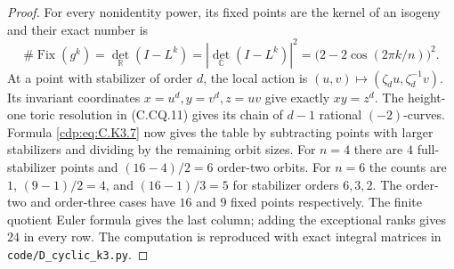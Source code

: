 \begin{proof}
For every nonidentity power, its fixed points are the
kernel of an isogeny and their exact number is
\[
 \#\operatorname{Fix}(g^k)
 =\det_{\mathbb R}(I-L^k)
 =|\det_{\mathbb C}(I-L^k)|^2
 =\bigl(2-2\cos(2\pi k/n)\bigr)^2.
                                                               \tag{C.K3.7}\label{cdp:eq:C.K3.7}
\]
At a point with stabilizer of order $d$, the local
action is $(u,v)\mapsto(\zeta_du,\zeta_d^{-1}v)$.
Its invariant coordinates $x=u^d,y=v^d,z=uv$ give
exactly $xy=z^d$. The height-one toric resolution
in (C.CQ.11) gives its chain of $d-1$ rational
$(-2)$-curves. Formula \eqref{cdp:eq:C.K3.7} now gives the table
by subtracting points with larger stabilizers and
dividing by the remaining orbit sizes. For $n=4$
there are $4$ full-stabilizer points and
$(16-4)/2=6$ order-two orbits. For $n=6$ the
counts are $1$, $(9-1)/2=4$, and
$(16-1)/3=5$ for stabilizer orders $6,3,2$.
The order-two and order-three cases have $16$ and
$9$ fixed points respectively. The finite quotient
Euler formula gives the last column; adding the
exceptional ranks gives $24$ in every row.
The computation is reproduced with exact integral
matrices in \texttt{code/D\_cyclic\_k3.py}.


\end{proof}
